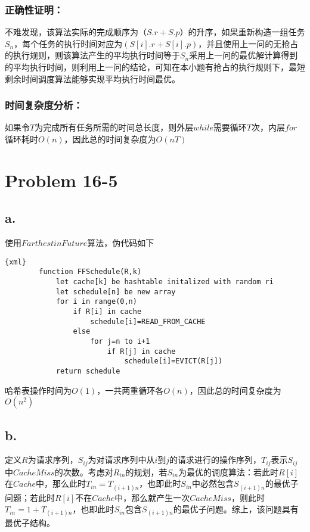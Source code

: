 \documentclass{article}
\begin{document}
        \subsubsection*{正确性证明：}
            不难发现，该算法实际的完成顺序为$（S.r+S.p）$的升序，如果重新构造一组任务$S_n$，每个任务的执行时间对应为$(S[i].r+S[i].p)$，并且使用上一问的无抢占的执行规则，则该算法产生的平均执行时间等于$S_n$采用上一问的最优解计算得到的平均执行时间，则利用上一问的结论，可知在本小题有抢占的执行规则下，最短剩余时间调度算法能够实现平均执行时间最优。
        \subsubsection*{时间复杂度分析：}
            如果令$T$为完成所有任务所需的时间总长度，则外层$while$需要循环$T$次，内层$for$循环耗时$O(n)$，因此总的时间复杂度为$O(nT)$
  \section*{Problem 16-5}
    \subsection*{a.}
        使用$Farthest in Future$算法，伪代码如下
        \begin{lstlisting}{xml}
        function FFSchedule(R,k)
            let cache[k] be hashtable initalized with random ri
            let schedule[n] be new array
            for i in range(0,n)
                if R[i] in cache
                    schedule[i]=READ_FROM_CACHE
                else
                    for j=n to i+1
                        if R[j] in cache
                            schedule[i]=EVICT(R[j])
            return schedule
        \end{lstlisting}
        哈希表操作时间为$O(1)$，一共两重循环各$O(n)$，因此总的时间复杂度为$O(n^2)$
    \subsection*{b.}
        定义$R$为请求序列，$S_{ij}$为对请求序列中从$i$到$j$的请求进行的操作序列，$T_{ij}$表示$S_{ij}$中$Cache Miss$的次数。考虑对$R_{in}$的规划，若$S_{in}$为最优的调度算法：若此时$R[i]$在$Cache$中，那么此时$T_{in}=T_{(i+1)n}$，也即此时$S_{in}$中必然包含$S_{(i+1)n}$的最优子问题；若此时$R[i]$不在$Cache$中，那么就产生一次$Cache Miss$，则此时$T_{in}=1+T_{(i+1)n}$，也即此时$S_{in}$包含$S_{(i+1)n}$的最优子问题。综上，该问题具有最优子结构。
\end{document}

